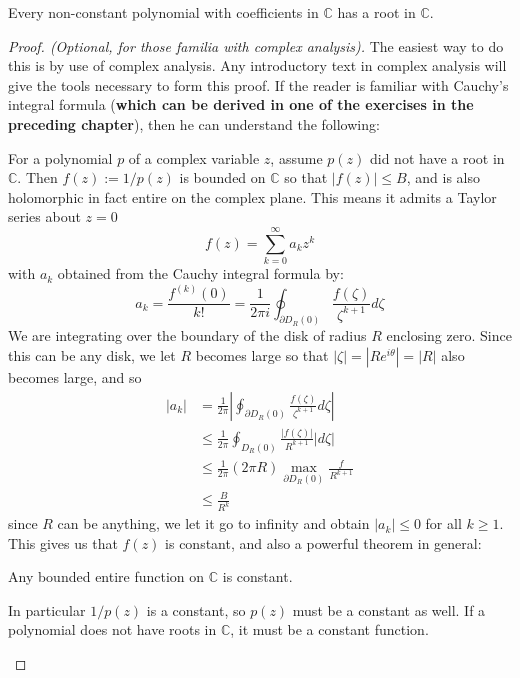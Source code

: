 	 \begin{theorem}
	 	Every non-constant polynomial with coefficients in $\mathbb{C}$ has a root in $\mathbb C$.
	 \end{theorem}
	 \begin{proof}[Proof. (Optional, for those familia with complex analysis)]
	 The easiest way to do this is by use of complex analysis. Any introductory text in complex analysis will give the tools necessary to form this proof. If the reader is familiar with Cauchy's integral formula (\textbf{which can be derived in one of the exercises in the preceding chapter}), then he can understand the following:\\
		
		\begin{small}
		
		For a polynomial $p$ of a complex variable $z$, assume $p(z)$ did not have a root in $\mathbb{C}$. Then $f(z):= 1/p(z)$ is bounded on $\mathbb{C}$ so that $|f(z)|\leq B$, and is also holomorphic in fact entire on the complex plane. This means it admits a Taylor series about $z=0$
		\begin{equation}
			f(z) = \sum_{k=0}^\infty a_k z^k
		\end{equation}
		with $a_k$ obtained from the Cauchy integral formula by:
		\begin{equation}
			a_k = \frac{f^{(k)}(0)}{k!} = \frac{1}{2\pi i} \oint_{\partial D_R(0)} \frac{f(\zeta)}{\zeta^{k+1}} d\zeta
		\end{equation}
		We are integrating over the boundary of the disk of radius $R$ enclosing zero. Since this can be any disk, we let $R$ becomes large so that $|\zeta| = |R e^{i\theta}| = |R|$ also becomes large, and so 
		\begin{align*}
			|a_k| &= \frac{1}{2\pi} \left|\oint_{\partial D_R (0)} \frac{f(\zeta)}{\zeta^{k+1}} d\zeta \right| \\
			&\leq \frac{1}{2\pi} \oint_{D_R(0)} \frac{|f(\zeta)|}{R^{k+1}} |d\zeta|\\
			&\leq \frac{1}{2\pi} (2 \pi R) \max_{\partial D_R (0)} \frac{f}{R^{k+1}}\\
			&\leq \frac{B}{R^k}
		\end{align*}
		since $R$ can be anything, we let it go to infinity and obtain $|a_k| \leq 0$ for all $k \geq 1$. This gives us that $f(z)$ is constant, and also a powerful theorem in general:
		\begin{theorem}[Liouville]
			Any bounded entire function on $\mathbb C$ is constant.
		\end{theorem}
		In particular $1/p(z)$ is a constant, so $p(z)$ must be a constant as well. If a polynomial does not have roots in $\mathbb{C}$, it must be a constant function.
		\end{small}
	 \end{proof}
	 
